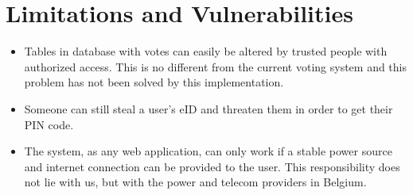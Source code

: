 \section{Limitations and Vulnerabilities}
\label{sec:limitations_vulnerabilities}

\begin{itemize}
    \item Tables in database with votes can easily be altered by trusted people with authorized access.
    This is no different from the current voting system and this problem has not been solved by this implementation.
    \item Someone can still steal a user's eID and threaten them in order to get their PIN code.
    \item The system, as any web application, can only work if a stable power source and internet connection can be provided to the user. This responsibility does not lie with us, but with the power and telecom providers in Belgium.
\end{itemize}

